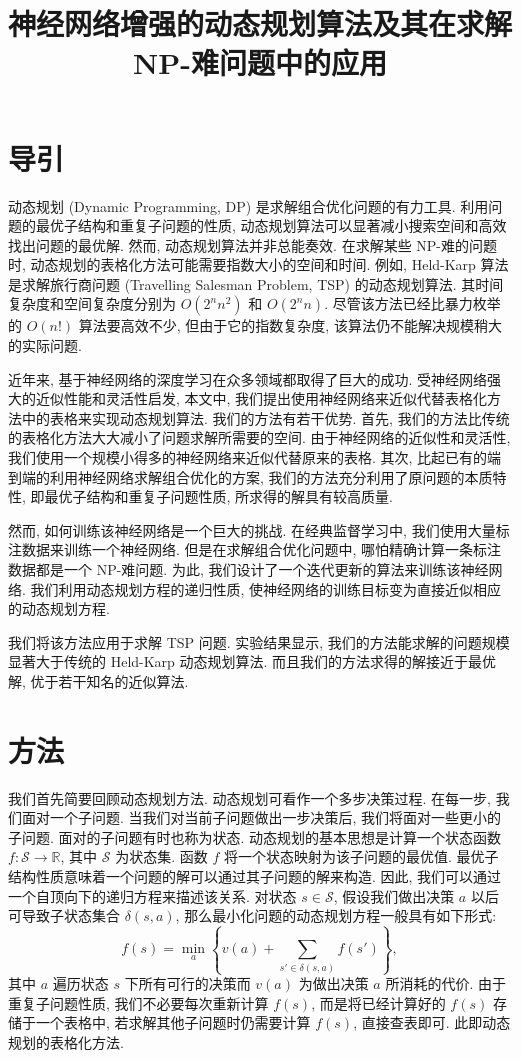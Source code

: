 \documentclass{article}
\title{神经网络增强的动态规划算法及其在求解NP-难问题中的应用}
\author{}
\date{}
\begin{document}
\maketitle

\section{导引}
动态规划 (Dynamic Programming, DP) 是求解组合优化问题的有力工具.
利用问题的最优子结构和重复子问题的性质, 动态规划算法可以显著减小搜索空间和高效找出问题的最优解.
然而, 动态规划算法并非总能奏效.
在求解某些 NP-难的问题时, 动态规划的表格化方法可能需要指数大小的空间和时间.
例如, Held-Karp 算法是求解旅行商问题 (Travelling Salesman Problem, TSP) 的动态规划算法.
其时间复杂度和空间复杂度分别为 $O(2^nn^2)$ 和 $O(2^nn)$.
尽管该方法已经比暴力枚举的 $O(n!)$ 算法要高效不少, 但由于它的指数复杂度, 该算法仍不能解决规模稍大的实际问题.

近年来, 基于神经网络的深度学习在众多领域都取得了巨大的成功.
受神经网络强大的近似性能和灵活性启发, 本文中, 我们提出使用神经网络来近似代替表格化方法中的表格来实现动态规划算法.
我们的方法有若干优势.
首先, 我们的方法比传统的表格化方法大大减小了问题求解所需要的空间.
由于神经网络的近似性和灵活性, 我们使用一个规模小得多的神经网络来近似代替原来的表格.
其次, 比起已有的端到端的利用神经网络求解组合优化的方案, 我们的方法充分利用了原问题的本质特性, 即最优子结构和重复子问题性质, 所求得的解具有较高质量.

然而, 如何训练该神经网络是一个巨大的挑战.
在经典监督学习中, 我们使用大量标注数据来训练一个神经网络.
但是在求解组合优化问题中, 哪怕精确计算一条标注数据都是一个 NP-难问题.
为此, 我们设计了一个迭代更新的算法来训练该神经网络.
我们利用动态规划方程的递归性质, 使神经网络的训练目标变为直接近似相应的动态规划方程.

我们将该方法应用于求解 TSP 问题.
实验结果显示, 我们的方法能求解的问题规模显著大于传统的 Held-Karp 动态规划算法.
而且我们的方法求得的解接近于最优解, 优于若干知名的近似算法.

\section{方法}

我们首先简要回顾动态规划方法.
动态规划可看作一个多步决策过程. 
在每一步, 我们面对一个子问题.
当我们对当前子问题做出一步决策后, 我们将面对一些更小的子问题.
面对的子问题有时也称为状态.
动态规划的基本思想是计算一个状态函数 $f: \mathcal{S} \to \mathbb{R}$, 其中 $\mathcal{S}$ 为状态集.
函数 $f$ 将一个状态映射为该子问题的最优值.
最优子结构性质意味着一个问题的解可以通过其子问题的解来构造.
因此, 我们可以通过一个自顶向下的递归方程来描述该关系.
对状态 $s \in \mathcal{S}$, 假设我们做出决策 $a$ 以后可导致子状态集合 $\delta(s, a)$, 那么最小化问题的动态规划方程一般具有如下形式:
\begin{equation} \label{eqn_1}
f(s) = \min_a \left\{v(a) + \sum_{s' \in \delta(s, a)}f(s')\right\},
\end{equation}
其中 $a$ 遍历状态 $s$ 下所有可行的决策而 $v(a)$ 为做出决策 $a$ 所消耗的代价.
由于重复子问题性质, 我们不必要每次重新计算 $f(s)$, 而是将已经计算好的 $f(s)$ 存储于一个表格中, 若求解其他子问题时仍需要计算 $f(s)$, 直接查表即可. 
此即动态规划的表格化方法.
\end{document}
